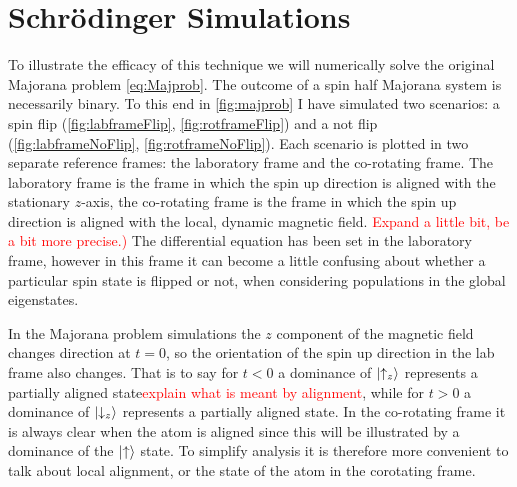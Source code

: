 
\section{Schr\"odinger Simulations}

To illustrate the efficacy of this technique we will numerically solve the original Majorana problem \autoref{eq:Majprob}.
The outcome of a spin half Majorana system is necessarily binary.
To this end in \autoref{fig:majprob} I have simulated two scenarios: a spin flip (\autoref{fig:labframeFlip}, \autoref{fig:rotframeFlip}) and a not flip (\autoref{fig:labframeNoFlip}, \autoref{fig:rotframeNoFlip}).
Each scenario is plotted in two separate reference frames: the laboratory frame and the co-rotating frame.
The laboratory frame is the frame in which the spin up direction is aligned with the stationary $z$-axis, the co-rotating frame is the frame in which the spin up direction is aligned with the local, dynamic magnetic field. \textcolor{red}{Expand a little bit, be a bit more precise.)}
The differential equation has been set in the laboratory frame, however in this frame it can become a little confusing about whether a particular spin state is flipped or not, when considering populations in the global eigenstates.

In the Majorana problem simulations the $z$ component of the magnetic field changes direction at $t=0$, so the orientation of the spin up direction in the lab frame also changes.
That is to say for $t<0$ a dominance of $\ket{\uparrow_z}$ represents a partially aligned state\textcolor{red}{explain what is meant by alignment}, while for $t>0$ a dominance of $\ket{\downarrow_z}$ represents a partially aligned state.
In the co-rotating frame it is always clear when the atom is aligned since this will be illustrated by a dominance of the $\ket{\uparrow}$ state.
To simplify analysis it is therefore more convenient to talk about local alignment, or the state of the atom in the corotating frame.

